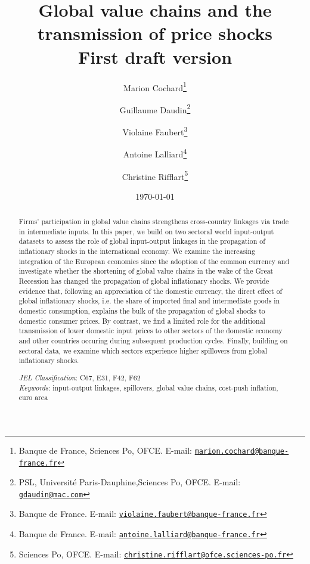 \documentclass[11pt,a4paper]{article}
\newcommand{\email}[1]{\href{mailto:#1}{\nolinkurl{#1}}}
\begin{document}
\title{Global value chains and the transmission of price shocks\\
\vspace{1cm}
\normalsize{First draft version}
}
\vspace{1cm}
\date{\today}
\author{Marion Cochard\thanks{Banque de France, Sciences Po, OFCE. E-mail: \email{marion.cochard@banque-france.fr}}\and Guillaume Daudin\thanks{PSL, Universit\'e Paris-Dauphine,Sciences Po, OFCE. E-mail: \email{gdaudin@mac.com}}\and Violaine Faubert\thanks{Banque de France. E-mail: \email{violaine.faubert@banque-france.fr}} \and Antoine Lalliard\thanks{Banque de France. E-mail: \email{antoine.lalliard@banque-france.fr}} \and Christine Rifflart\thanks{Sciences Po, OFCE. E-mail: \email{christine.rifflart@ofce.sciences-po.fr}}
}
\maketitle
\begin{abstract}
{\small \noindent
Firms' participation in global value chains strengthens cross-country linkages via trade in intermediate inputs. 
In this paper, we build on two sectoral world input-output datasets  to assess the role of global input-output linkages in the propagation of inflationary shocks in the international economy. 
We examine the increasing integration of the European economies since the adoption of the common currency and investigate whether the shortening of global value chains in the wake of the Great Recession has changed the propagation of global inflationary shocks. We provide evidence that, following an appreciation of the domestic currency, the direct effect of global inflationary shocks, i.e. the share of imported final and intermediate goods in domestic consumption, explains the bulk of the propagation of global shocks to domestic consumer prices. By contrast, we find a limited role for the additional transmission of lower domestic input prices to other sectors of the domestic economy and other countries occuring during subsequent production cycles. Finally, building on sectoral data, we examine which sectors experience higher spillovers from global inflationary shocks.
}

{\small \bigskip \noindent \emph{JEL Classification}\/: C67, E31, F42, F62\\}
{\small \noindent \emph{Keywords}\/: input-output linkages, spillovers, global value chains, cost-push inflation, euro area \\}
\end{abstract}
\end{document}
